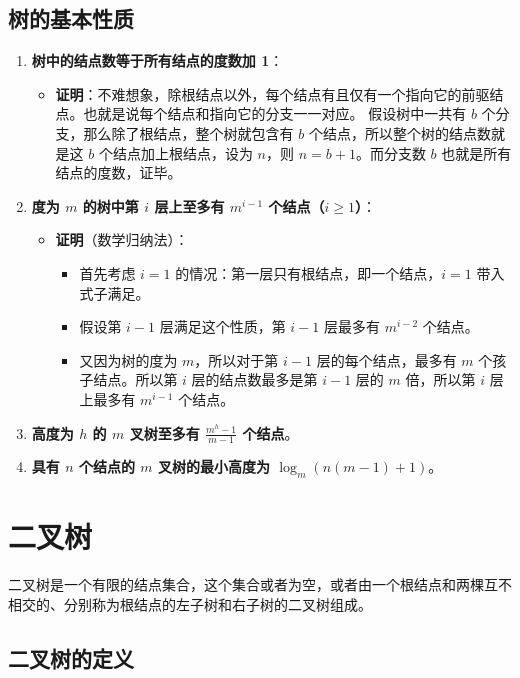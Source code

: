 \documentclass[lang=cn,newtx,10pt,scheme=chinese]{../elegantbook}
\begin{document}
\subsection{树的基本性质}

\begin{enumerate}
  \item \textbf{树中的结点数等于所有结点的度数加 1}：
  \begin{itemize}
    \item \textbf{证明}：不难想象，除根结点以外，每个结点有且仅有一个指向它的前驱结点。也就是说每个结点和指向它的分支一一对应。
    假设树中一共有 $b$ 个分支，那么除了根结点，整个树就包含有 $b$ 个结点，所以整个树的结点数就是这 $b$ 个结点加上根结点，设为 $n$，则 $n = b + 1$。而分支数 $b$ 也就是所有结点的度数，证毕。
  \end{itemize}

  \item \textbf{度为 $m$ 的树中第 $i$ 层上至多有 $m^{i-1}$ 个结点（$i \geq 1$）}：
  \begin{itemize}
    \item \textbf{证明}（数学归纳法）：
    \begin{itemize}
      \item 首先考虑 $i = 1$ 的情况：第一层只有根结点，即一个结点，$i = 1$ 带入式子满足。
      \item 假设第 $i-1$ 层满足这个性质，第 $i-1$ 层最多有 $m^{i-2}$ 个结点。
      \item 又因为树的度为 $m$，所以对于第 $i-1$ 层的每个结点，最多有 $m$ 个孩子结点。所以第 $i$ 层的结点数最多是第 $i-1$ 层的 $m$ 倍，所以第 $i$ 层上最多有 $m^{i-1}$ 个结点。
    \end{itemize}
  \end{itemize}

  \item \textbf{高度为 $h$ 的 $m$ 叉树至多有 $\frac{m^h - 1}{m - 1}$ 个结点}。

  \item \textbf{具有 $n$ 个结点的 $m$ 叉树的最小高度为 $\log_m(n(m-1)+1)$}。
\end{enumerate}


\section{二叉树}
二叉树是一个有限的结点集合，这个集合或者为空，或者由一个根结点和两棵互不相交的、分别称为根结点的左子树和右子树的二叉树组成。

\subsection{二叉树的定义}
\end{document}
